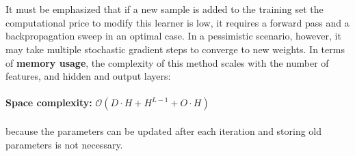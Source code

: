 \documentclass[paper=a4, fontsize=11pt]{scrartcl} %
\begin{document}
\\
\\
It must be emphasized that if a new sample is added to the training set the computational price to modify this learner is low, it requires a forward pass and a backpropagation sweep in an optimal case. 
In a pessimistic scenario, however, it may take multiple stochastic gradient steps to converge to new weights.
In terms of \textbf{memory usage}, the complexity of this method scales with the number of features, and hidden and output layers:
\\
\\
\textbf{Space complexity:} $\mathcal{O}(D\cdot H+H^{L-1}+O\cdot H)$
\\
\\
because the parameters can be updated after each iteration and storing old parameters is not necessary.
\end{document}
